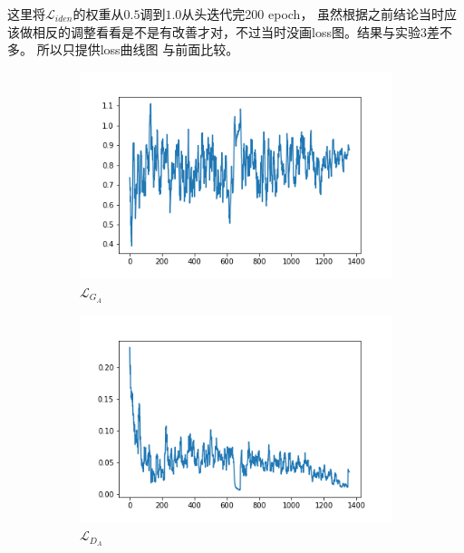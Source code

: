 \documentclass[twocolumn,11pt]{ctexart}
\begin{document}
这里将$\mathcal{L}_{iden}$的权重从$0.5$调到$1.0$从头迭代完200 epoch，
虽然根据之前结论当时应该做相反的调整看看是不是有改善才对，不过当时没画loss图。结果与实验3差不多。
所以只提供loss曲线图 与前面比较。

\begin{figure}[htb]
    \centering
    \begin{subfigure}[b]{0.23\linewidth}
        \includegraphics[width=\linewidth]{exp4_G_A.png}
        \caption{$\mathcal{L}_{G_A}$}
      \end{subfigure}
      \begin{subfigure}[b]{0.23\linewidth}
        \includegraphics[width=\linewidth]{exp4_D_A.png}
        \caption{$\mathcal{L}_{D_A}$}
      \end{subfigure}
      \begin{subfigure}[b]{0.23\linewidth}

\end{subfigure}
\end{figure}
\end{document}

